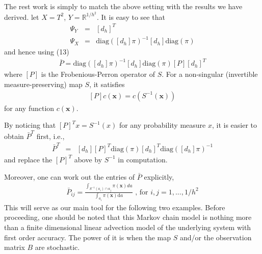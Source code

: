 \documentclass{article}
\begin{document}
The rest work is simply to match the above setting with the results we have derived. let $X = T^2$, $Y = \mathbb{R}^{1/h^2}$. It is easy to see that 
\begin{eqnarray}
\Psi_Y &=& [d_h]^T\\
\Psi_X &=& \text{diag}([d_h]\pi)^{-1}[d_h]\text{diag}(\pi)
\end{eqnarray}
and hence using (13)
\begin{eqnarray}
\bar{P} = \text{diag}([d_h]\pi)^{-1}[d_h]\text{diag}(\pi) [P] [d_h]^T
\end{eqnarray}
where $[P]$ is the Frobenious-Perron operator of $S$. For a non-singular (invertible measure-preserving) map $S$, it satisfies
\begin{eqnarray}
\label{FPoperator}
  [P]c(\mathbf{x})=c(S^{-1}(\mathbf{x}))
\end{eqnarray}
for any function $c(\mathbf{x})$. 

By noticing that $[P]^T x =S^{-1}(x) $ for any probability measure $x$, it is easier to obtain $\bar{P}^T$ first, i.e.,
\begin{eqnarray}
\bar{P}^T &=& [d_h] [P]^T \text{diag}(\pi) [d_h]^T  \text{diag}([d_h]\pi)^{-1}          
\end{eqnarray}  
and replace the $[P]^T$ above by $S^{-1}$ in computation.

Moreover, one can work out the entries of $\bar{P}$ explicitly,
\begin{eqnarray}
\label{P definition}
     \bar{P}_{ij} = \frac{\int_{S^{-1}(a_i) \cap a_j  } \pi(\mathbf{x})da}{\int_{a_i} \pi(\mathbf{x}) \text{d}a 
     } \mbox{   , for } i,j = 1,...,1/h^2
\end{eqnarray}
This will serve as our main tool for the following two examples.
Before proceeding, one should be noted that this Markov chain model is nothing more than a finite dimensional linear advection model of the underlying system with first order accuracy. The power of it is when the map $S$ and/or the observation matrix $B$ are stochastic.  

\end{document}
